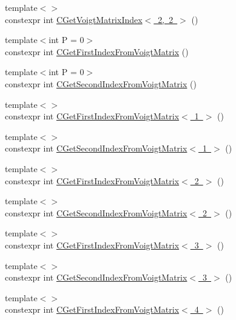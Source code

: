 \begin{DoxyCompactItemize}
{\footnotesize template$<$$>$ }\\constexpr int \mbox{\hyperlink{namespacempc_1_1utilities_a519182cb74988fa0a719633a416b07f6}{C\+Get\+Voigt\+Matrix\+Index$<$ 2, 2 $>$}} ()
\item 
{\footnotesize template$<$int P = 0$>$ }\\constexpr int \mbox{\hyperlink{namespacempc_1_1utilities_acb1091d4fd58c0821eeeba68a43146ac}{C\+Get\+First\+Index\+From\+Voigt\+Matrix}} ()
\item 
{\footnotesize template$<$int P = 0$>$ }\\constexpr int \mbox{\hyperlink{namespacempc_1_1utilities_a094a324d81b996e8397336286264dfcd}{C\+Get\+Second\+Index\+From\+Voigt\+Matrix}} ()
\item 
{\footnotesize template$<$$>$ }\\constexpr int \mbox{\hyperlink{namespacempc_1_1utilities_a9d279abaf7dfef3e9192f7b778eb68fa}{C\+Get\+First\+Index\+From\+Voigt\+Matrix$<$ 1 $>$}} ()
\item 
{\footnotesize template$<$$>$ }\\constexpr int \mbox{\hyperlink{namespacempc_1_1utilities_ac600a3a4e8be50854214d495b7672444}{C\+Get\+Second\+Index\+From\+Voigt\+Matrix$<$ 1 $>$}} ()
\item 
{\footnotesize template$<$$>$ }\\constexpr int \mbox{\hyperlink{namespacempc_1_1utilities_a9c173e2ecba984e738a4a21047fc78f7}{C\+Get\+First\+Index\+From\+Voigt\+Matrix$<$ 2 $>$}} ()
\item 
{\footnotesize template$<$$>$ }\\constexpr int \mbox{\hyperlink{namespacempc_1_1utilities_ace2b5aa12b0c53dfb13b277172f636d3}{C\+Get\+Second\+Index\+From\+Voigt\+Matrix$<$ 2 $>$}} ()
\item 
{\footnotesize template$<$$>$ }\\constexpr int \mbox{\hyperlink{namespacempc_1_1utilities_a80545c6ddda43d5f72754d0f18ec42fc}{C\+Get\+First\+Index\+From\+Voigt\+Matrix$<$ 3 $>$}} ()
\item 
{\footnotesize template$<$$>$ }\\constexpr int \mbox{\hyperlink{namespacempc_1_1utilities_a1ab261832775728a8dd9aec99a9b8255}{C\+Get\+Second\+Index\+From\+Voigt\+Matrix$<$ 3 $>$}} ()
\item 
{\footnotesize template$<$$>$ }\\constexpr int \mbox{\hyperlink{namespacempc_1_1utilities_a9cc9cf00e8b46c7b4089290a9801dab8}{C\+Get\+First\+Index\+From\+Voigt\+Matrix$<$ 4 $>$}} ()

\end{DoxyCompactItemize}
